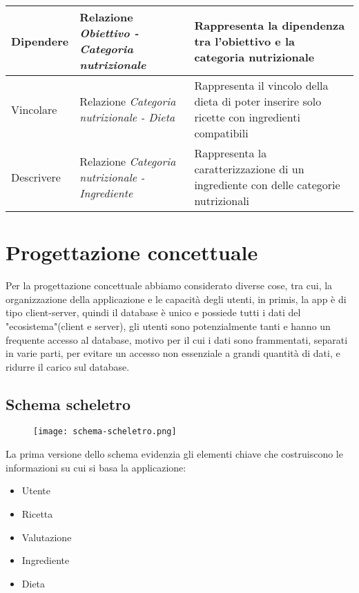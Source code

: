 ﻿\documentclass[a4paper,12pt]{report}
\begin{document}
\begin{table}[h!]
\begin{tabular}{ |p{0.7in}|p{1.9in}|p{2.4in}| }
        \hline
        \scriptsize{Dipendere} & \scriptsize{Relazione \newline \textit{Obiettivo - Categoria nutrizionale}} & \scriptsize{Rappresenta la dipendenza tra l'obiettivo e la categoria nutrizionale} \\
        \hline
        \scriptsize{Vincolare} & \scriptsize{Relazione \newline \textit{Categoria nutrizionale - Dieta}} & \scriptsize{Rappresenta il vincolo della dieta di poter inserire solo ricette con ingredienti compatibili} \\
        \hline
        \scriptsize{Descrivere} & \scriptsize{Relazione \newline \textit{Categoria nutrizionale - Ingrediente}} & \scriptsize{Rappresenta la caratterizzazione di un ingrediente con delle categorie nutrizionali} \\
        \hline
    \end{tabular}
\end{table}

\chapter{Progettazione concettuale}
Per la progettazione concettuale abbiamo considerato diverse cose,
tra cui, la organizzazione della applicazione e le capacità degli utenti,
in primis, la app è di tipo client-server, quindi il database è unico e
possiede tutti i dati del "ecosistema"(client e server), gli utenti sono potenzialmente tanti
e hanno un frequente accesso al database, motivo per il cui i dati sono
frammentati, separati in varie parti, per evitare un accesso non essenziale a grandi quantità di dati, e ridurre il carico sul database.    
\section{Schema scheletro}
\begin{figure}[H]
    \centering
   \texttt{[image: schema-scheletro.png]}  
    \label{fig:example}
\end{figure}
La prima versione dello schema evidenzia gli elementi chiave 
che costruiscono le informazioni su cui si basa la applicazione:
\begin{itemize}
    \item Utente
    \item Ricetta
    \item Valutazione
    \item Ingrediente
    \item Dieta
\end{itemize}
\end{document}
